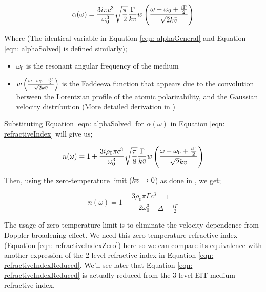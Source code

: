 \begin{equation}
    \alpha(\omega) = \frac{3i\pi c^{3}}{\omega_{0}^{3}} \sqrt{\frac{\pi}{2}} \frac{\Gamma}{k\Bar{v}} w\left(\frac{\omega - \omega_{0} + \frac{i\Gamma}{2}}{\sqrt{2}k\Bar{v}}\right)
    \label{eqn: alphaSolved}
\end{equation}

Where (The identical variable in Equation \ref{eqn: alphaGeneral} and Equation \ref{eqn: alphaSolved} is defined similarly);

\begin{itemize}
    \item $\omega_{0}$ is the resonant angular frequency of the medium
    \item $w\left(\frac{\omega - \omega_{0} + \frac{i\Gamma}{2}}{\sqrt{2}k\Bar{v}}\right)$ is the Faddeeva function that appears due to the convolution between the Lorentzian profile of the atomic polarizability, and the Gaussian velocity distribution \cite{Kwong2017} (More detailed derivation in \cite{abramowitz1965ia})
\end{itemize}

\newpage

Substituting Equation \ref{eqn: alphaSolved} for $\alpha(\omega)$ in Equation \ref{eqn: refractiveIndex} will give us;

\begin{equation}
    n(\omega) = 1 + \frac{3i\rho_{0}\pi c^{3}}{\omega_{0}^{3}} \sqrt{\frac{\pi}{8}} \frac{\Gamma}{k\Bar{v}} w\left(\frac{\omega - \omega_{0} + \frac{i\Gamma}{2}}{\sqrt{2}k\Bar{v}}\right)
\end{equation}

Then, using the zero-temperature limit ($k\Bar{v} \rightarrow 0$) as done in \cite{Kwong2017}, we get;

\begin{equation}
    n(\omega) = 1 - \frac{3\rho_{0}\pi\Gamma c^{3}}{2\omega_{0}^{3}} \frac{1}{\Delta + \frac{i\Gamma}{2}}
    \label{eqn: refractiveIndexZero}
\end{equation}

The usage of zero-temperature limit is to eliminate the velocity-dependence from Doppler broadening effect. We need this zero-temperature refractive index (Equation \ref{eqn: refractiveIndexZero}) here so we can compare its equivalence with another expression of the 2-level refractive index in Equation \ref{eqn: refractiveIndexReduced}. We'll see later that Equation \ref{eqn: refractiveIndexReduced} is actually reduced from the 3-level EIT medium refractive index.

